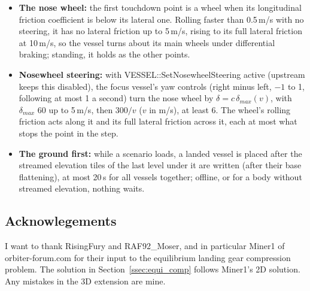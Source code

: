 \documentclass[Orbiter Technical Reference.tex]{subfiles}
\begin{document}
\begin{itemize}
\item \textbf{The nose wheel:} the first touchdown point is a wheel when its longitudinal friction coefficient is below its lateral one. Rolling faster than 0.5\,m/s with no steering, it has no lateral friction up to 5\,m/s, rising to its full lateral friction at 10\,m/s, so the vessel turns about its main wheels under differential braking; standing, it holds as the other points.
\item \textbf{Nosewheel steering:} with VESSEL::SetNosewheelSteering active (upstream keeps this disabled), the focus vessel's yaw controls (right minus left, $-1$ to 1, following at most 1 a second) turn the nose wheel by $\delta = c\,\delta_{max}(v)$, with $\delta_{max}$ 60\textdegree{} up to 5\,m/s, then 300\textdegree{}$/v$ ($v$ in m/s), at least 6\textdegree{}. The wheel's rolling friction acts along it and its full lateral friction across it, each at most what stops the point in the step.
\item \textbf{The ground first:} while a scenario loads, a landed vessel is placed after the streamed elevation tiles of the last level under it are written (after their base flattening), at most 20\,s for all vessels together; offline, or for a body without streamed elevation, nothing waits.
\end{itemize}

\subsection{Acknowlegements}
I want to thank RisingFury and RAF92\_Moser, and in particular Miner1 of orbiter-forum.com for their input to the equilibrium landing gear compression problem. The solution in Section~\ref{ssec:equi_comp} follows Miner1's 2D solution. Any mistakes in the 3D extension are mine.
\end{document}
